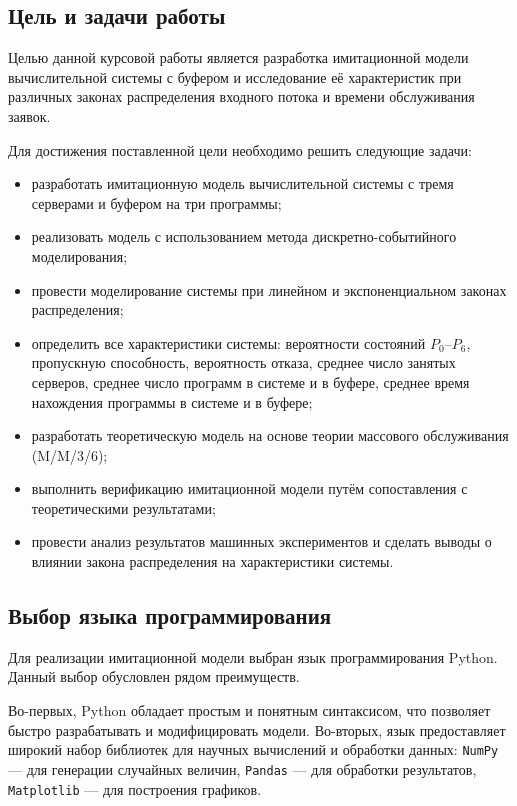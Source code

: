 \documentclass[14pt,a4paper]{extarticle}
\begin{document}
\subsection{Цель и задачи работы}

Целью данной курсовой работы является разработка имитационной модели
вычислительной системы с буфером и исследование её характеристик при различных
законах распределения входного потока и времени обслуживания заявок.

Для достижения поставленной цели необходимо решить следующие задачи:
\begin{itemize}
  \item разработать имитационную модель вычислительной системы с тремя серверами
        и буфером на три программы;
  \item реализовать модель с использованием метода дискретно-событийного
        моделирования;
  \item провести моделирование системы при линейном и экспоненциальном законах
        распределения;
  \item определить все характеристики системы: вероятности состояний $P_0$--$P_6$,
        пропускную способность, вероятность отказа, среднее число занятых серверов,
        среднее число программ в системе и в буфере, среднее время нахождения
        программы в системе и в буфере;
  \item разработать теоретическую модель на основе теории массового обслуживания
        (M/M/3/6);
  \item выполнить верификацию имитационной модели путём сопоставления с
        теоретическими результатами;
  \item провести анализ результатов машинных экспериментов и сделать выводы о
        влиянии закона распределения на характеристики системы.
\end{itemize}

\subsection{Выбор языка программирования}

Для реализации имитационной модели выбран язык программирования Python. Данный
выбор обусловлен рядом преимуществ.

Во-первых, Python обладает простым и понятным синтаксисом, что позволяет быстро
разрабатывать и модифицировать модели. Во-вторых, язык предоставляет широкий
набор библиотек для научных вычислений и обработки данных: \texttt{NumPy} ---
для генерации случайных величин, \texttt{Pandas} --- для обработки результатов,
\texttt{Matplotlib} --- для построения графиков.
\end{document}

